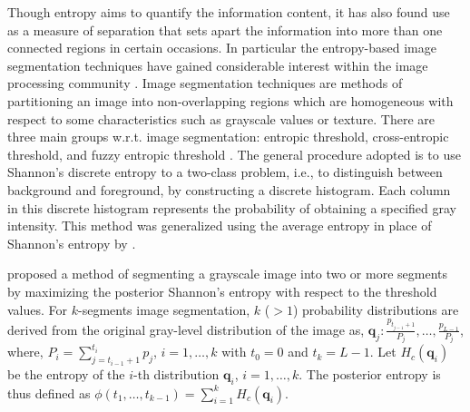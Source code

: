 \documentclass{article}
\begin{document}
Though entropy aims to quantify the information content, it has also found use as a measure of separation that sets apart the information into more than one connected regions \citep{al2007thresholding} in certain occasions. In particular the entropy-based image segmentation techniques have gained considerable interest within the image processing community \citep{mahmoudi2012survey,kittaneh2016average}. %
Image segmentation techniques are methods of partitioning an image into non-overlapping regions which are homogeneous with respect to some characteristics such as grayscale values or texture. There are three main groups w.r.t. image segmentation: entropic threshold, cross-entropic threshold, and fuzzy entropic threshold \citep{sezgin2004survey,csengur2006comparative}.
The general procedure adopted is to use Shannon's discrete entropy to a two-class problem, i.e., to distinguish between background and foreground, by constructing a discrete histogram. Each column in this discrete histogram represents the probability of obtaining a specified gray intensity. This method was generalized using the average entropy in place of Shannon's entropy by \cite{ferraro1999representation}.\par

 \cite{kapur1985new} proposed a method of segmenting a grayscale image into two or more segments by maximizing the posterior Shannon's entropy with respect to the threshold values. For $k$-segments image segmentation, $k$ ($>1$) probability distributions are derived from the original gray-level distribution of the image as, $\mathbf{q}_j : \frac{p_{t_{j-1}+1}}{P_j},\dots,\frac{p_{L-1}}{P_j}$,
where, $P_i=\sum_{j=t_{i-1}+1}^{t_i} p_j$, $i=1,\dots,k$ with $t_0=0$ and $t_{k}=L-1$. Let $H_c(\mathbf{q}_i)$ be the entropy of the $i$-th distribution $\mathbf{q}_i$, $i=1,\dots,k$. The posterior entropy is thus defined as $\phi(t_1,\dots, t_{k-1})=\sum_{i=1}^k H_c(\mathbf{q}_i).$
\end{document}
